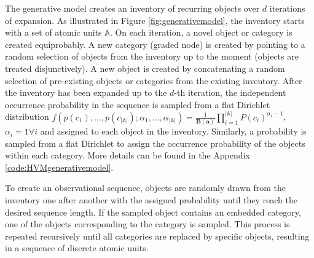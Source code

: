 \documentclass{article} %
\theoremstyle{remark}
\begin{document}
The generative model creates an inventory of recurring objects over $d$ iterations of expansion. As illustrated in Figure \ref{fig:generativemodel}, the inventory starts with a set of atomic units $\mathbb{A}$. 
On each iteration, a novel object or category is created equiprobably. A new category (graded node) is created by pointing to a random selection of objects from the inventory up to the moment (objects are treated disjunctively). A new object is created by concatenating a random selection of pre-existing objects or categories from the existing inventory. After the inventory has been expanded up to the $d$-th iteration, the independent occurrence probability in the sequence is sampled from a flat Dirichlet distribution $f(p(c_1),...,p(c_{|\mathbb{A}|});\alpha_1,...,\alpha_{|\mathbb{A}|}) = \frac{1}{\mathbf{B}(\mathbf{a})}\prod_{i = 1}^{|\mathbb{A}|} P(c_i)^{\alpha_i - 1}$, $\alpha_i = 1 \forall i $ and assigned to each object in the inventory. Similarly, a probability is sampled from a flat Dirichlet to assign the occurrence probability of the objects within each category. More details can be found in the Appendix \ref{code:HVMgenerativemodel}. 

To create an observational sequence, objects are randomly drawn from the inventory one after another with the assigned probability until they reach the desired sequence length. If the sampled object contains an embedded category, one of the objects corresponding to the category is sampled. This process is repeated recursively until all categories are replaced by specific objects, resulting in a sequence of discrete atomic units.



\end{document}
